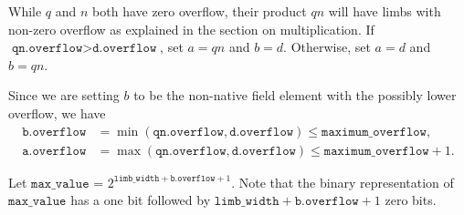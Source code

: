 \documentclass[a4paper, 12pt]{article}
\begin{document}
While $q$ and $n$ both have zero overflow, their product $qn$ will have limbs with non-zero overflow as explained in the section on multiplication. If $\texttt{qn.overflow} > \texttt{d.overflow}$, set $a = qn$ and $b = d$. Otherwise, set $a = d$ and $b = qn$.

Since we are setting $b$ to be the non-native field element with the possibly lower overflow, we have
\begin{align*}
  \texttt{b.overflow} & = \min(\texttt{qn.overflow}, \texttt{d.overflow}) \le \texttt{maximum\_overflow}, \\
\texttt{a.overflow} & = \max(\texttt{qn.overflow}, \texttt{d.overflow}) \le \texttt{maximum\_overflow} + 1.
\end{align*}

Let $\texttt{max\_value}$ = $2^{\texttt{limb\_width}+\texttt{b.overflow}+1}$. Note that the binary representation of $\texttt{max\_value}$ has a one bit followed by $\texttt{limb\_width} + \texttt{b.overflow}+1$ zero bits. 
\end{document}
